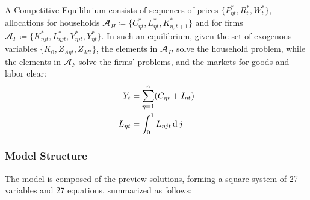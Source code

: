 \documentclass[
	thesis.tex
	]{subfiles}
\begin{document}
A Competitive Equilibrium consists of sequences of prices $\{P_{\eta t}^\ast, R_t^\ast, W_t^\ast\}$, allocations for households $\mathbfscr{A}_H \coloneq \{C_{\eta t}^\ast, L_{\eta t}^\ast, K_{\eta, t+1}^\ast\}$ and for firms $\mathbfscr{A}_F \coloneq \{K_{\eta jt}^\ast, L_{\eta jt}^\ast, Y_{\eta jt}^\ast, Y_{\eta t}^\ast\}$. In such an equilibrium, given the set of exogenous variables $\{K_0, Z_{A\eta t}, Z_{Mt}\}$, the elements in $\mathbfscr{A}_H$ solve the household problem, while the elements in $\mathbfscr{A}_F$ solve the firms' problems, and the markets for goods and labor clear:
\begin{align}
	Y_t &= \sum_{\eta=1}^{n} (C_{\eta t} + I_{\eta t}) \label{eq:reg-market-clearing-condition} \\
	L_{\eta t} &= \int_{0}^{1} L_{\eta jt} \operatorname{d} j \label{eq:reg-market-clearing-condition-2}
\end{align}

\newpage


\subsubsection{Model Structure}

The model is composed of the preview solutions, forming a square system of 27 variables and 27 equations, summarized as follows:
\end{document}

